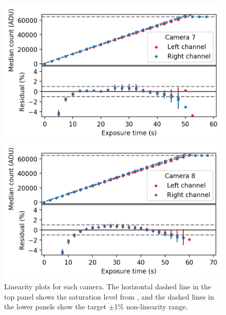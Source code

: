 \begin{colsection}
\begin{colsection}
\begin{figure}[p]
\begin{center}
        \begin{minipage}[t]{0.47\textwidth}\vspace{10pt}
            \includegraphics[width=\linewidth]{images/detectors/lin_7.png}
        \end{minipage}
        \begin{minipage}[t]{0.47\textwidth}\vspace{10pt}
            \includegraphics[width=\linewidth]{images/detectors/lin_8.png}
        \end{minipage}
    \end{center}
    \caption[Linearity plots]{
        Linearity plots for each camera. The horizontal dashed line in the top panel shows the saturation level from , and the dashed lines in the lower panels show the target $\pm$1\% non-linearity range.
    }\label{fig:lin}
\end{figure}

\clearpage


\end{colsection}
\end{colsection}
